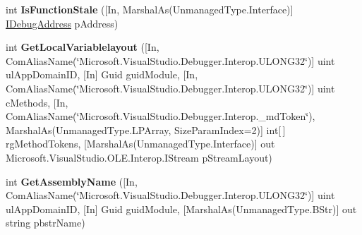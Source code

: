 \begin{DoxyCompactItemize}
\item 
\hypertarget{interface_microsoft_1_1_visual_studio_1_1_debugger_1_1_interop_e_e_1_1_i_debug_com_plus_symbol_provider2_a6c499015ab86da89fdd97018f24e9fdb}{int {\bfseries Is\+Function\+Stale} (\mbox{[}In, Marshal\+As(Unmanaged\+Type.\+Interface)\mbox{]} \hyperlink{interface_microsoft_1_1_visual_studio_1_1_debugger_1_1_interop_e_e_1_1_i_debug_address}{I\+Debug\+Address} p\+Address)}\label{interface_microsoft_1_1_visual_studio_1_1_debugger_1_1_interop_e_e_1_1_i_debug_com_plus_symbol_provider2_a6c499015ab86da89fdd97018f24e9fdb}

\item 
\hypertarget{interface_microsoft_1_1_visual_studio_1_1_debugger_1_1_interop_e_e_1_1_i_debug_com_plus_symbol_provider2_a887ae1a6b19d14b97555e0cd079516e2}{int {\bfseries Get\+Local\+Variablelayout} (\mbox{[}In, Com\+Alias\+Name(\char`\"{}Microsoft.\+Visual\+Studio.\+Debugger.\+Interop.\+U\+L\+O\+N\+G32\char`\"{})\mbox{]} uint ul\+App\+Domain\+I\+D, \mbox{[}In\mbox{]} Guid guid\+Module, \mbox{[}In, Com\+Alias\+Name(\char`\"{}Microsoft.\+Visual\+Studio.\+Debugger.\+Interop.\+U\+L\+O\+N\+G32\char`\"{})\mbox{]} uint c\+Methods, \mbox{[}In, Com\+Alias\+Name(\char`\"{}Microsoft.\+Visual\+Studio.\+Debugger.\+Interop.\+\_\+md\+Token\char`\"{}), Marshal\+As(Unmanaged\+Type.\+L\+P\+Array, Size\+Param\+Index=2)\mbox{]} int\mbox{[}$\,$\mbox{]} rg\+Method\+Tokens, \mbox{[}Marshal\+As(Unmanaged\+Type.\+Interface)\mbox{]} out Microsoft.\+Visual\+Studio.\+O\+L\+E.\+Interop.\+I\+Stream p\+Stream\+Layout)}\label{interface_microsoft_1_1_visual_studio_1_1_debugger_1_1_interop_e_e_1_1_i_debug_com_plus_symbol_provider2_a887ae1a6b19d14b97555e0cd079516e2}

\item 
\hypertarget{interface_microsoft_1_1_visual_studio_1_1_debugger_1_1_interop_e_e_1_1_i_debug_com_plus_symbol_provider2_adfb58be9ae5e95f7d463d26a07293179}{int {\bfseries Get\+Assembly\+Name} (\mbox{[}In, Com\+Alias\+Name(\char`\"{}Microsoft.\+Visual\+Studio.\+Debugger.\+Interop.\+U\+L\+O\+N\+G32\char`\"{})\mbox{]} uint ul\+App\+Domain\+I\+D, \mbox{[}In\mbox{]} Guid guid\+Module, \mbox{[}Marshal\+As(Unmanaged\+Type.\+B\+Str)\mbox{]} out string pbstr\+Name)}\label{interface_microsoft_1_1_visual_studio_1_1_debugger_1_1_interop_e_e_1_1_i_debug_com_plus_symbol_provider2_adfb58be9ae5e95f7d463d26a07293179}


\end{DoxyCompactItemize}
